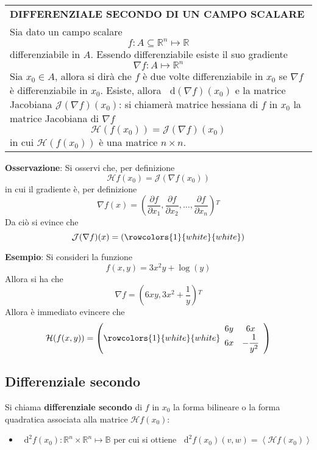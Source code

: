 \documentclass[a4paper]{extarticle}
\renewcommand\arraystretch{}
\newcommand*\dif{\mathop{}\!\mathrm{d}}
\begin{document}
\vspace{1em}
\setlength{\tabcolsep}{14pt}
\renewcommand{\arraystretch}{2}
\noindent
\begin{tabularx}{\textwidth}{@{}|P|@{}}
    \hline
    {\textbf{DIFFERENZIALE SECONDO DI UN CAMPO SCALARE}}\\
    \parbox{\linewidth}{Sia dato un campo scalare
    \[f : A \subseteq \mathbb{R}^n \longmapsto \mathbb{R}\]
    differenziabile in $A$. Essendo differenziabile esiste il suo gradiente
    \[\nabla f : A \longmapsto \mathbb{R}^n\]
    Sia $x_0 \in A$, allora si dirà che $f$ è due volte differenziabile in $x_0$ se $\nabla f$ è differenziabile in $x_0$.\\
    Esiste, allora $\dif (\nabla f) (x_0)$ e la matrice Jacobiana $\mathcal{J}(\nabla f)(x_0)$: si chiamerà matrice hessiana di $f$ in $x_0$ la matrice Jacobiana di $\nabla f$
    \[\mathcal{H}(f(x_0)) = \mathcal{J}(\nabla f)(x_0)\]
    in cui $\mathcal{H} (f(x_0))$ è una matrice $n \times n$.\vspace{3mm}}\\
    \hline
\end{tabularx}

\vspace{1em}
\noindent
\textbf{Osservazione}: Si osservi che, per definizione
\[\mathcal{H} f(x_0) = \mathcal{J}(\nabla f(x_0))\]
in cui il gradiente è, per definizione
\[\nabla f(x) = \left(\dfrac{\partial f}{\partial x_1}, \dfrac{\partial f}{\partial x_2}, \dots, \dfrac{\partial f}{\partial x_n}\right){^T}\]
Da ciò si evince che
\[\mathcal{J}(\nabla f)(x) = \left(
    \rowcolors{1}{white}{white}    
    \begin{array}{cccc}

    \end{array}
\right)\]

\vspace{2em}
\noindent
\textbf{Esempio}: Si consideri la funzione
\[f(x,y) = 3x^2y + \log(y)\]
Allora si ha che
\[\nabla f = \left(6xy,3x^2+\dfrac{1}{y} \right){^T}\]
Allora è immediato evincere che
\[\mathcal{H}(f(x,y)) = \left(
    \rowcolors{1}{white}{white}    
    \begin{array}{cc}
        6y & 6x\\
        6x & -\dfrac{1}{y^2}
    \end{array}
\right)\]

\vspace{2em}
\noindent
\subsection{Differenziale secondo}
Si chiama \textbf{differenziale secondo} di $f$ in $x_0$ la forma bilineare o la forma quadratica associata alla matrice $\mathcal{H} f(x_0)$:
\begin{itemize}
    \item $\displaystyle{\dif^2 f(x_0) : \mathbb{R}^n \times \mathbb{R}^n \longmapsto \mathbb{B}}$ per cui si ottiene $\displaystyle{\dif^2 f(x_0)(v,w) = \left<\mathcal{H}f(x_0)\right>}$
\end{itemize}
\end{document}
